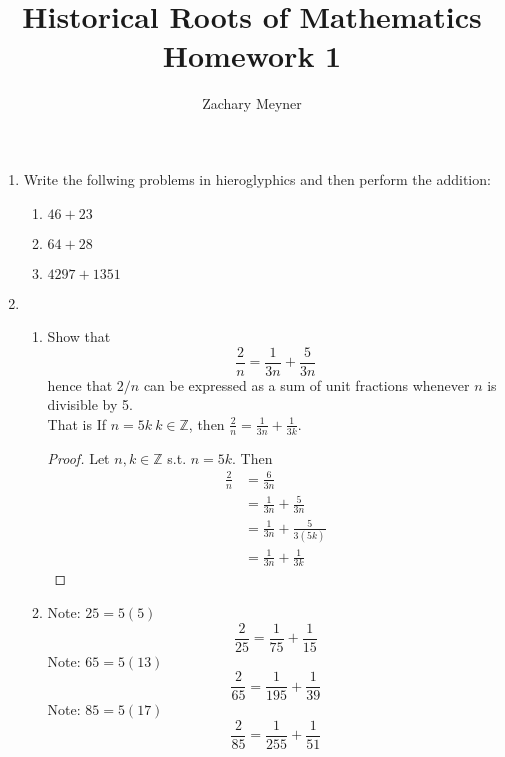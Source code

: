 \documentclass[12pt]{article}
\title{\large Historical Roots of Mathematics Homework 1}
\author{\large Zachary Meyner}
\date{}
\newcommand\setitemnumber[1]{\setcounter{enumi}{\numexpr#1-- -1\relax}}
\begin{document}
\maketitle
\begin{enumerate}[label=\arabic*.]
    \setitemnumber{1}
    \item Write the follwing problems in hieroglyphics and then perform the addition:
    \begin{enumerate}[label=\alph*.]
        \item $46+23$ \vspace{50mm}
        \item $64+28$ \vspace{50mm}
        \item $4297+1351$ \vspace{50mm}
    \end{enumerate}
    \item 
    \begin{enumerate}[label=\alph*.]
        \item Show that 
        \[ \frac{2}{n} = \frac{1}{3n}+\frac{5}{3n} \]
        hence that $2/n$ can be expressed as a sum of unit fractions whenever $n$ is divisible by 5. \\
        That is 
        If $n=5k \ k \in \mathbb{Z}$, then $\displaystyle\frac{2}{n} = \displaystyle\frac{1}{3n} + \displaystyle\frac{1}{3k}$.
        \begin{proof}
            Let $n,k \in \mathbb{Z}$ s.t. $n = 5k$. Then
            \begin{align*}
                \frac{2}{n} &= \frac{6}{3n} \\
                &= \frac{1}{3n} + \frac{5}{3n} \\
                &= \frac{1}{3n} + \frac{5}{3(5k)} \\
                &= \frac{1}{3n} + \frac{1}{3k}
            \end{align*}
        \end{proof}
        \item Note: $25 = 5(5)$
        \[\frac{2}{25} = \frac{1}{75} + \frac{1}{15} \]
        Note: $65 = 5(13)$
        \[\frac{2}{65} = \frac{1}{195} + \frac{1}{39} \]
        Note: $85 = 5(17)$
        \[\frac{2}{85} = \frac{1}{255} + \frac{1}{51} \] 
    \end{enumerate}
\end{enumerate}
\end{document}
